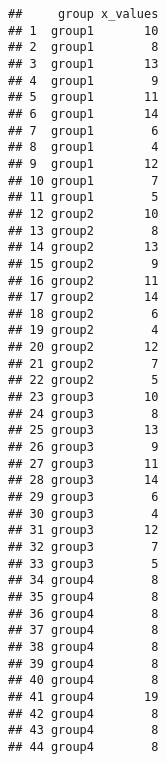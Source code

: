 \documentclass[]{book}
\newenvironment{Shaded}{\begin{snugshade}}{\end{snugshade}}
\newcommand{\CommentTok}[1]{\textcolor[rgb]{0.56,0.35,0.01}{\textit{#1}}}
\newcommand{\DataTypeTok}[1]{\textcolor[rgb]{0.13,0.29,0.53}{#1}}
\newcommand{\KeywordTok}[1]{\textcolor[rgb]{0.13,0.29,0.53}{\textbf{#1}}}
\newcommand{\NormalTok}[1]{#1}
\newcommand{\OperatorTok}[1]{\textcolor[rgb]{0.81,0.36,0.00}{\textbf{#1}}}
\newcommand{\StringTok}[1]{\textcolor[rgb]{0.31,0.60,0.02}{#1}}
\theoremstyle{definition}
\theoremstyle{definition}
\theoremstyle{definition}
\theoremstyle{remark}
\begin{document}
\begin{Shaded}
\end{Shaded}

\begin{verbatim}
##     group x_values
## 1  group1       10
## 2  group1        8
## 3  group1       13
## 4  group1        9
## 5  group1       11
## 6  group1       14
## 7  group1        6
## 8  group1        4
## 9  group1       12
## 10 group1        7
## 11 group1        5
## 12 group2       10
## 13 group2        8
## 14 group2       13
## 15 group2        9
## 16 group2       11
## 17 group2       14
## 18 group2        6
## 19 group2        4
## 20 group2       12
## 21 group2        7
## 22 group2        5
## 23 group3       10
## 24 group3        8
## 25 group3       13
## 26 group3        9
## 27 group3       11
## 28 group3       14
## 29 group3        6
## 30 group3        4
## 31 group3       12
## 32 group3        7
## 33 group3        5
## 34 group4        8
## 35 group4        8
## 36 group4        8
## 37 group4        8
## 38 group4        8
## 39 group4        8
## 40 group4        8
## 41 group4       19
## 42 group4        8
## 43 group4        8
## 44 group4        8
\end{verbatim}

\begin{Shaded}
\end{Shaded}
\end{document}

